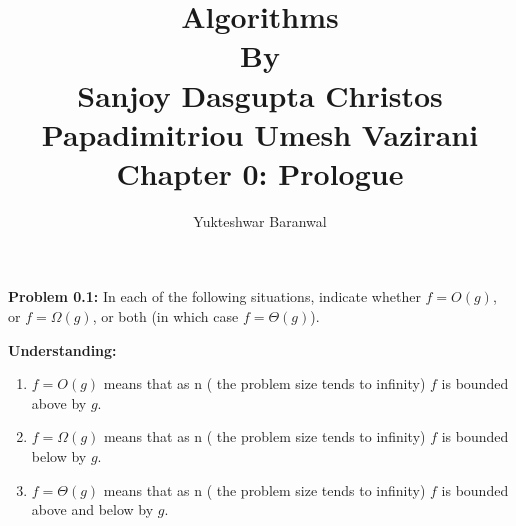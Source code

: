 \documentclass[11pt]{article}
\title{Algorithms\\By\\Sanjoy Dasgupta Christos Papadimitriou Umesh Vazirani \\ Chapter 0: Prologue}
\author{Yukteshwar Baranwal}
\begin{document}
	\maketitle
	
	\textbf{Problem 0.1:} In each of the following situations, indicate whether $f = O(g)$, or $f = \Omega(g)$, or both (in which case $f = \Theta(g)$).
	
	\textbf{Understanding:} 
	\begin{enumerate}
		\item $f = O(g)$ means that as n ( the problem size tends to infinity) $f$ is bounded above by $g$.
		\item $f = \Omega(g)$ means that as n ( the problem size tends to infinity) $f$ is bounded below by $g$.
		\item $f = \Theta(g)$ means that as n ( the problem size tends to infinity) $f$ is bounded above and below by $g$.
	\end{enumerate}
	
\end{document}

